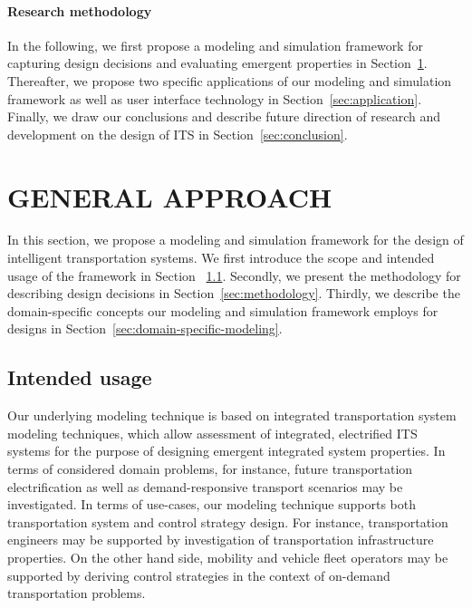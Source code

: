 \documentclass[a4paper,twoside]{article}
\begin{document}
	\paragraph{Research methodology}
	
	In the following, we first propose a modeling and simulation framework for capturing design decisions and evaluating emergent properties in Section~\ref{sec:approach}.
	Thereafter, we propose two specific applications of our modeling and simulation framework as well as user interface technology in Section~\ref{sec:application}.
	Finally, we draw our conclusions and describe future direction of research and development on the design of ITS in Section~\ref{sec:conclusion}. 
	
	
	\section{\uppercase{General approach}}
	\label{sec:approach}
	
	In this section, we propose a modeling and simulation framework for the design of intelligent transportation systems.
	We first introduce the scope and intended usage of the framework in Section ~\ref{sec:scope}.
	Secondly, we present the methodology for describing design decisions in Section~\ref{sec:methodology}.
	Thirdly, we describe the domain-specific concepts our modeling and simulation framework employs for designs in Section~\ref{sec:domain-specific-modeling}.
	
	\subsection{Intended usage}
	\label{sec:scope}
	
	Our underlying modeling technique is based on integrated transportation system modeling techniques, which allow assessment of integrated, electrified ITS systems for the purpose of designing emergent integrated system properties.
	In terms of considered domain problems, for instance, future transportation electrification as well as demand-responsive transport scenarios may be investigated.
	In terms of use-cases, our modeling technique supports both transportation system and control strategy design.
	For instance, transportation engineers may be supported by investigation of transportation infrastructure properties.
	On the other hand side, mobility and vehicle fleet operators may be supported by deriving control strategies in the context of on-demand transportation problems.
	
\end{document}

